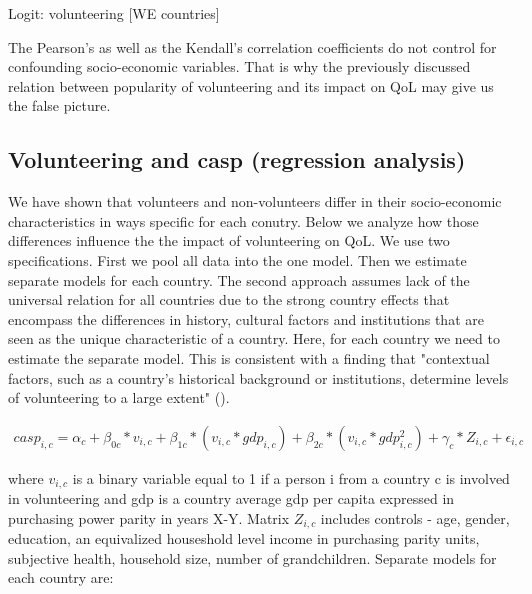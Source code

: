 \documentclass[10pt, letterpaper]{article}
\begin{document}
\begin{spacing}{1.4}
\begin{spacing}{.9}
\begin{table}[H]
\centering 
\caption{Logit: volunteering [WE countries]}  
\begin{small} 
	 
      \label{logitWE} 
\end{small}
\end{table}
\end{spacing}



The Pearson's as well as the Kendall's correlation coefficients do not control for confounding socio-economic variables. That is why the previously discussed relation between popularity of volunteering and its impact on QoL may give us the false picture. 
 
\subsection*{Volunteering and casp (regression analysis)}

We have shown that volunteers and non-volunteers differ in their  socio-economic characteristics in ways specific for each conutry.  Below we analyze how those differences influence the the impact of volunteering on QoL. We use two specifications. First we pool all data into the one model. Then we estimate separate models for each country. The second approach assumes lack of the universal relation for all countries due to the strong country effects that  encompass the differences in history, cultural factors and institutions that are seen as the unique characteristic of a country. Here, for each country we need to estimate the separate model. This is consistent with a finding that "contextual factors, such as a country’s historical background or institutions, determine levels of volunteering to a large extent" (\citet{plagnol10}).

  \begin{eqnarray}
	casp_{i,c}= \alpha_{c}+ \beta_{0c}*v_{i,c} + \beta_{1c}*(v_{i,c}*gdp_{i,c})+ \beta_{2c}*(v_{i,c}*gdp_{i,c}^{2}) + \gamma_{c}*Z_{i,c} + \epsilon_{i,c}
 \end{eqnarray}

where $v_{i,c}$ is a binary variable equal to 1 if a person i from a country c is involved in  volunteering  and gdp is a country average gdp per capita expressed in purchasing power parity in years X-Y. Matrix $Z_{i,c}$ includes controls - age, gender, education, an equivalized houseshold level income in purchasing parity units, subjective health, household size, number of grandchildren.
Separate models for each country are:


\end{spacing}
\end{document}

